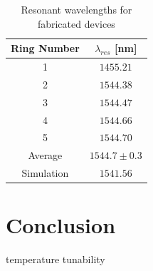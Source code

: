\documentclass[letterpaper, 10 pt, conference]{ieeeconf}
\begin{document}
\begin{table}[!ht]
\centering
\caption{Resonant wavelengths for fabricated devices}
\begin{tabular}{|c|c|}
\hline
\textbf{Ring Number} & \textbf{$\lambda_{res}$ {[}nm{]}} \\ \hline
1 & $1455.21$ \\ \hline
2 & $1544.38$ \\ \hline
3 & $1544.47$ \\ \hline
4 & $1544.66$ \\ \hline
5 & $1544.70$ \\ \hline
Average & $1544.7 \pm 0.3$ \\ \hline
Simulation & $1541.56$ \\ \hline
\end{tabular}
\label{tab:lambdares}
\end{table}



\section{Conclusion}

temperature tunability







\end{document}
